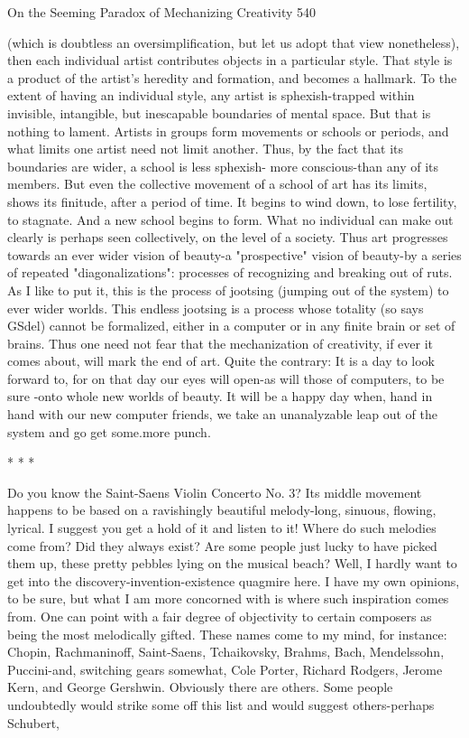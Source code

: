On the Seeming Paradox of Mechanizing Creativity                                    540

(which is doubtless an oversimplification, but let us adopt that view nonetheless), then
each individual artist contributes objects in a particular style. That style is a product of
the artist's heredity and formation, and becomes a hallmark. To the extent of having
an individual style, any artist is sphexish-trapped within invisible, intangible, but
inescapable boundaries of mental space. But that is nothing to lament. Artists in
groups form movements or schools or periods, and what limits one artist need not
limit another. Thus, by the fact that its boundaries are wider, a school is less sphexish-
more conscious-than any of its members.
          But even the collective movement of a school of art has its limits, shows its
finitude, after a period of time. It begins to wind down, to lose fertility, to stagnate.
And a new school begins to form. What no individual can make out clearly is perhaps
seen collectively, on the level of a society. Thus art progresses towards an ever wider
vision of beauty-a "prospective" vision of beauty-by a series of repeated
"diagonalizations": processes of recognizing and breaking out of ruts. As I like to put
it, this is the process of jootsing (jumping out of the system) to ever wider worlds.
          This endless jootsing is a process whose totality (so says GSdel) cannot be
formalized, either in a computer or in any finite brain or set of brains. Thus one need
not fear that the mechanization of creativity, if ever it comes about, will mark the end
of art. Quite the contrary: It is a day to look forward to, for on that day our eyes will
open-as will those of computers, to be sure -onto whole new worlds of beauty. It will
be a happy day when, hand in hand with our new computer friends, we take an
unanalyzable leap out of the system and go get some.more punch.

                                         *   *   *

        Do you know the Saint-Saens Violin Concerto No. 3? Its middle movement
happens to be based on a ravishingly beautiful melody-long, sinuous, flowing, lyrical.
I suggest you get a hold of it and listen to it! Where do such melodies come from? Did
they always exist? Are some people just lucky to have picked them up, these pretty
pebbles lying on the musical beach?
        Well, I hardly want to get into the discovery-invention-existence quagmire
here. I have my own opinions, to be sure, but what I am more concorned with is
where such inspiration comes from. One can point with a fair degree of objectivity to
certain composers as being the most melodically gifted. These names come to my
mind, for instance: Chopin, Rachmaninoff, Saint-Saens, Tchaikovsky, Brahms, Bach,
Mendelssohn, Puccini-and, switching gears somewhat, Cole Porter, Richard Rodgers,
Jerome Kern, and George Gershwin. Obviously there are others. Some people
undoubtedly would strike some off this list and would suggest others-perhaps
Schubert,




